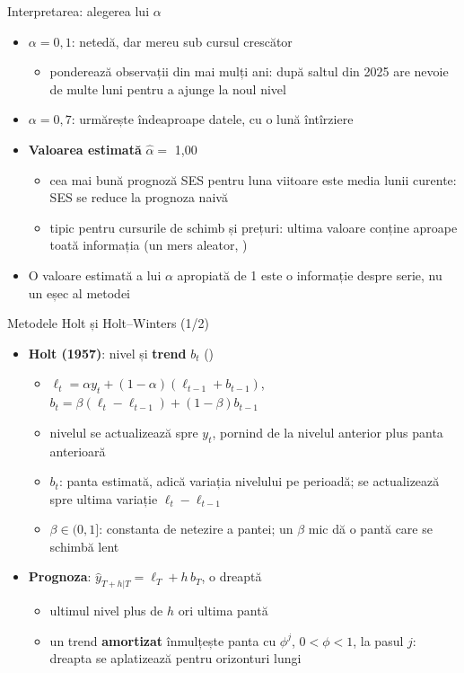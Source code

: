 \begin{frame}{Interpretarea: alegerea lui $\alpha$}
\itemsize{\small}
\begin{itemize}
    \item \textbf{$\alpha = 0{,}1$}: netedă, dar mereu sub cursul crescător
    \begin{itemize}
        \item ponderează observații din mai mulți ani: după saltul din 2025 are nevoie de multe luni pentru a ajunge la noul nivel
    \end{itemize}
    \item \textbf{$\alpha = 0{,}7$}: urmărește îndeaproape datele, cu o lună întîrziere
    \item \textbf{Valoarea estimată} $\hat\alpha = $ 1{,}00
    \begin{itemize}
        \item cea mai bună prognoză SES pentru luna viitoare este media lunii curente: SES se reduce la prognoza naivă
        \item tipic pentru cursurile de schimb și prețuri: ultima valoare conține aproape toată informația (un mers aleator, )
    \end{itemize}
    \item O valoare estimată a lui $\alpha$ apropiată de 1 este o informație despre serie, nu un eșec al metodei
\end{itemize}
\end{frame}

\begin{frame}{Metodele Holt și Holt--Winters (1/2)}
\itemsize{\footnotesize}
\begin{itemize}
    \item \textbf{Holt (1957)}: nivel și \textbf{trend} $b_t$ ()
    \begin{itemize}
        \item $\ell_t = \alpha y_t + (1-\alpha)(\ell_{t-1} + b_{t-1})$, \ $b_t = \beta (\ell_t - \ell_{t-1}) + (1-\beta) b_{t-1}$
        \item nivelul se actualizează spre $y_t$, pornind de la nivelul anterior plus panta anterioară
        \item $b_t$: panta estimată, adică variația nivelului pe perioadă; se actualizează spre ultima variație $\ell_t - \ell_{t-1}$
        \item $\beta \in (0, 1]$: constanta de netezire a pantei; un $\beta$ mic dă o pantă care se schimbă lent
    \end{itemize}
    \item \textbf{Prognoza}: $\hat y_{T+h|T} = \ell_T + h\, b_T$, o dreaptă
    \begin{itemize}
        \item ultimul nivel plus de $h$ ori ultima pantă
        \item un trend \textbf{amortizat} înmulțește panta cu $\phi^j$, $0 < \phi < 1$, la pasul $j$: dreapta se aplatizează pentru orizonturi lungi
    \end{itemize}
\end{itemize}
\end{frame}

